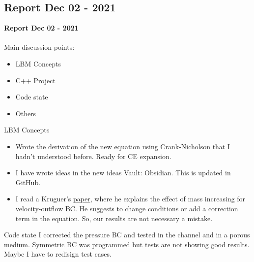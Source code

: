 \documentclass{beamer}
\begin{document}
	
	\subsection{Report Dec 02 - 2021}
	\justifying
	\begin{frame}
		\textbf{Report Dec 02 - 2021}\\~\\
		Main discussion points:
		\begin{itemize}
			\item LBM Concepts
			\item C++ Project
			\item Code state
			\item Others
		\end{itemize}
	\end{frame}
	\begin{frame}{LBM Concepts}
		\begin{itemize}
			\item Wrote the derivation of the new equation using Crank-Nicholson that I hadn't understood before. Ready for CE expansion.\\
		
			\item I have wrote ideas in the new ideas Vault: Obsidian. This is updated in GitHub.\\
		
			\item I read a Kruguer's \href{https://journals.aps.org/pre/abstract/10.1103/PhysRevE.79.046704}{\color{red} paper}, where he explains the effect of mass increasing for velocity-outflow BC. He suggests to change conditions or add a correction term in the equation. So, our results are not necessary a mistake.
		\end{itemize}
	\end{frame}
	
	\begin{frame}{Code state}
		I corrected the pressure BC and tested in the channel and in a porous medium. \alert{Symmetric BC was programmed but tests are not showing good results. Maybe I have to redisign test cases.}
		
	\end{frame}
\end{document}
